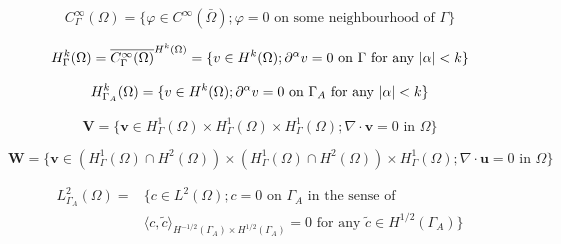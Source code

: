 \documentclass{beamer}
\begin{document}
\begin{frame}
  \[ C^{\infty}_\Gamma (\Omega) = \{ \varphi \in C^\infty (\bar{\Omega}); \varphi = 0 \text{ on some neighbourhood of } \Gamma\} \]
  
  \[ H^k_{\Gamma} (\Omega) = \overline{C_\Gamma ^ \infty (\Omega)} ^ {H^k (\Omega)} = \{ v \in H^k(\Omega); \partial^\alpha v=0 \text{ on } \Gamma \text{ for any } \abs{\alpha} < k \} \]
  
  \[ H^k_{\Gamma_A} (\Omega) = \{ v \in H^k(\Omega); \partial^\alpha v=0 \text{ on } \Gamma_A \text{ for any } \abs{\alpha} < k \} \]
  
  \[ \mathbf{V} = \{ \mathbf{v} \in  H^1_{\Gamma} (\Omega) \times H^1_{\Gamma} (\Omega) \times H^1_{\Gamma} (\Omega); \nabla \cdot \mathbf{v} = 0 \text{ in } \Omega \} \]
  
  \[ \mathbf{W} = \{ \mathbf{v} \in  (H^1_{\Gamma} (\Omega) \cap H^2(\Omega)) \times (H^1_{\Gamma} (\Omega) \cap H^2(\Omega)) \times H^1_{\Gamma} (\Omega); \nabla \cdot \mathbf{u} = 0 \text{ in } \Omega \} \]
  
\begin{align}
L^2_{\Gamma_A}(\Omega) = & \{ c \in L^2(\Omega); c = 0 \text{ on } \Gamma_A \text{ in the sense of } \nonumber \\
& \langle c , \tilde{c} \rangle_{H^{-1/2} (\Gamma_A) \times H^{1/2} (\Gamma_A)} = 0 \text{ for any } \tilde{c} \in H^{1/2}(\Gamma_A) \nonumber \}
\end{align}
\end{frame}
\end{document}
